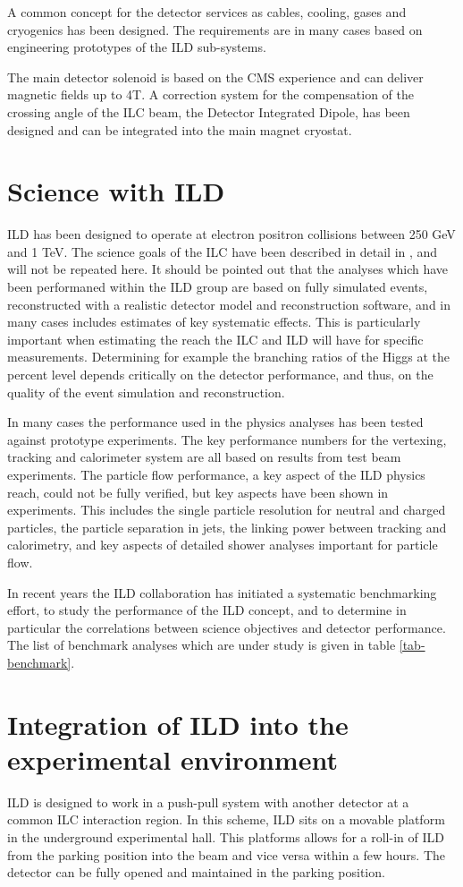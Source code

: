 \documentclass[%
 amsmath,amssymb,
 aps,
]{revtex4-1}
\begin{document}
A common concept for the detector services as cables, cooling, gases and cryogenics has been designed. The requirements are in many cases based on engineering prototypes of the ILD sub-systems. 

The main detector solenoid is based on the CMS experience and can deliver magnetic fields up to 4T. A correction system for the compensation of the crossing angle of the ILC beam, the Detector Integrated Dipole, has been designed and can be integrated into the main magnet cryostat.

\section{Science with ILD}
ILD has been designed to operate at electron positron collisions between 250 GeV and 1 TeV. The science goals of the ILC have been described in detail in \cite{ILC-ESU1}, and will not be repeated here. It should be pointed out that the analyses which have been performaned within the ILD group are based on fully simulated events, reconstructed with a realistic detector model and reconstruction software, and in many cases includes estimates of key systematic effects. This is particularly important when estimating the reach the ILC and ILD will have for specific measurements. Determining for example the branching ratios of the Higgs at the percent level depends critically on the detector performance, and thus, on the quality of the event simulation and reconstruction. 

In many cases the performance used in the physics analyses has been tested against prototype experiments. The key performance numbers for the vertexing, tracking and calorimeter system are all based on results from test beam experiments. The particle flow performance, a key aspect of the ILD physics reach, could not be fully verified, but key aspects have been shown in experiments. This includes the single particle resolution for neutral and charged particles, the particle separation in jets, the linking power between tracking and calorimetry, and key aspects of detailed shower analyses important for particle flow. 

In recent years the ILD collaboration has initiated a systematic benchmarking effort, to study the performance of the ILD concept, and to determine in particular the correlations between science objectives and detector performance. The list of benchmark analyses which are under study is given in table \ref{tab-benchmark}. 


\section{Integration of ILD into the experimental environment}
ILD is designed to work in a push-pull system with another detector at a common ILC interaction region. In this scheme, ILD sits on a movable platform in the underground experimental hall. This platforms allows for a roll-in of ILD from the parking position into the beam and vice versa within a few hours. The detector can be fully opened and maintained in the parking position.
\end{document}
